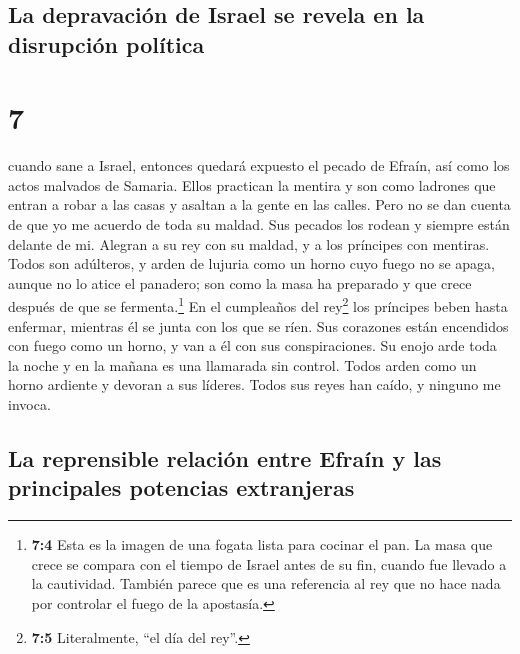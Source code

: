 \hypertarget{la-depravaciuxf3n-de-israel-se-revela-en-la-disrupciuxf3n-poluxedtica}{%
\subsection{La depravación de Israel se revela en la disrupción
política}\label{la-depravaciuxf3n-de-israel-se-revela-en-la-disrupciuxf3n-poluxedtica}}

\hypertarget{section-6}{%
\section{7}\label{section-6}}

 cuando sane a Israel, entonces quedará expuesto el pecado
de Efraín, así como los actos malvados de Samaria. Ellos practican la
mentira y son como ladrones que entran a robar a las casas y asaltan a
la gente en las calles.  Pero no se dan cuenta de que yo
me acuerdo de toda su maldad. Sus pecados los rodean y siempre están
delante de mi.  Alegran a su rey con su maldad, y a los
príncipes con mentiras.  Todos son adúlteros, y arden de
lujuria como un horno cuyo fuego no se apaga, aunque no lo atice el
panadero; son como la masa ha preparado y que crece después de que se
fermenta.\footnote{\textbf{7:4} Esta es la imagen de una fogata lista
  para cocinar el pan. La masa que crece se compara con el tiempo de
  Israel antes de su fin, cuando fue llevado a la cautividad. También
  parece que es una referencia al rey que no hace nada por controlar el
  fuego de la apostasía.}  En el cumpleaños del
rey\footnote{\textbf{7:5} Literalmente, ``el día del rey''.} los
príncipes beben hasta enfermar, mientras él se junta con los que se
ríen.  Sus corazones están encendidos con fuego como un
horno, y van a él con sus conspiraciones. Su enojo arde toda la noche y
en la mañana es una llamarada sin control.  Todos arden
como un horno ardiente y devoran a sus líderes. Todos sus reyes han
caído, y ninguno me invoca.

\hypertarget{la-reprensible-relaciuxf3n-entre-efrauxedn-y-las-principales-potencias-extranjeras}{%
\subsection{La reprensible relación entre Efraín y las principales
potencias
extranjeras}\label{la-reprensible-relaciuxf3n-entre-efrauxedn-y-las-principales-potencias-extranjeras}}

